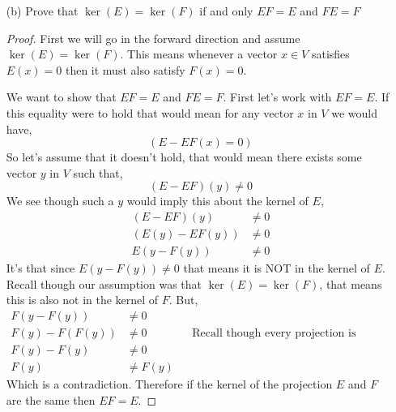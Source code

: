 \documentclass[12pt]{article}
\begin{document}
\begin{itemize}
\begin{itemize}
\begin{proof}
        $y$ started in the image of $F$, but we can see that it is also in the image of $E$. This gives us that $\text{im}(F) \subseteq \text{im}(E)$

        Putting this all together we have, \[\text{im}(E) \subseteq \text{im}(F) \text{ and } \text{im}(F) \subseteq \text{im}(E) \rightarrow \text{im}(F) = \text{im}(E)\]
        as desired.
    \end{proof}

    \vspace{.3cm}
    \item[(b)]
    Prove that $\ker(E) = \ker(F)$ if and only $EF = E$ and $FE = F$ 
    \begin{proof}
        First we will go in the forward direction and assume $\ker(E) = \ker(F)$. This means whenever a vector $x\in V$ satisfies $E(x) = 0$ then it must also satisfy $F(x) = 0$. 

        We want to show that $EF =E$ and $FE = F$. First let's work with $EF = E$. If this equality were to hold that would mean for any vector $x$ in $V$ we would have,
        \[(E-EF(x) = 0)\]
        So let's assume that it doesn't hold, that would mean there exists some vector $y$ in $V$ such that,
        \[(E-EF)(y) \neq 0\]
        We see though such a $y$ would imply this about the kernel of $E$,
        \begin{align*}
            (E-EF)(y) &\neq 0 \\
            (E(y) - EF(y)) &\neq 0 \\
            E(y - F(y)) & \neq 0 
        \end{align*}
        It's that since $E(y - F(y)) \neq 0$ that means it is NOT in the kernel of $E$. Recall though our assumption was that $\ker(E) = \ker(F)$, that means this is also not in the kernel of $F$. But,
        \begin{align*}
            F(y - F(y)) &\neq 0 \\
            F(y) - F(F(y)) &\neq 0 && \text{Recall though every projection is idempotent} \\
            F(y) - F(y) &\neq 0 \\ 
            F(y) &\neq F(y)
        \end{align*}
        Which is a contradiction. Therefore if the kernel of the projection $E$ and $F$ are the same then $EF = E$. 


\end{proof}
\end{itemize}
\end{itemize}
\end{document}
